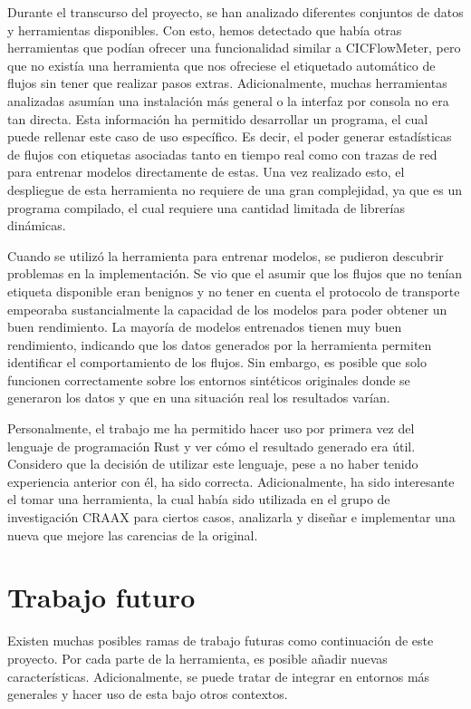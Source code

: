 Durante el transcurso del proyecto, se han analizado diferentes conjuntos de datos y herramientas disponibles. Con esto, hemos detectado que había otras herramientas que podían ofrecer una funcionalidad similar a CICFlowMeter, pero que no existía una herramienta que nos ofreciese el etiquetado automático de flujos sin tener que realizar pasos extras. Adicionalmente, muchas herramientas analizadas asumían una instalación más general o la interfaz por consola no era tan directa. Esta información ha permitido desarrollar un programa, el cual puede rellenar este caso de uso específico. Es decir, el poder generar estadísticas de flujos con etiquetas asociadas tanto en tiempo real como con trazas de red para entrenar modelos directamente de estas. Una vez realizado esto, el despliegue de esta herramienta no requiere de una gran complejidad, ya que es un programa compilado, el cual requiere una cantidad limitada de librerías dinámicas.

Cuando se utilizó la herramienta para entrenar modelos, se pudieron descubrir problemas en la implementación. Se vio que el asumir que los flujos que no tenían etiqueta disponible eran benignos y no tener en cuenta el protocolo de transporte empeoraba sustancialmente la capacidad de los modelos para poder obtener un buen rendimiento. La mayoría de modelos entrenados tienen muy buen rendimiento, indicando que los datos generados por la herramienta permiten identificar el comportamiento de los flujos. Sin embargo, es posible que solo funcionen correctamente sobre los entornos sintéticos originales donde se generaron los datos y que en una situación real los resultados varían.

Personalmente, el trabajo me ha permitido hacer uso por primera vez del lenguaje de programación Rust y ver cómo el resultado generado era útil. Considero que la decisión de utilizar este lenguaje, pese a no haber tenido experiencia anterior con él, ha sido correcta. Adicionalmente, ha sido interesante el tomar una herramienta, la cual había sido utilizada en el grupo de investigación CRAAX para ciertos casos, analizarla y diseñar e implementar una nueva que mejore las carencias de la original.

\section{Trabajo futuro}

Existen muchas posibles ramas de trabajo futuras como continuación de este proyecto. Por cada parte de la herramienta, es posible añadir nuevas características. Adicionalmente, se puede tratar de integrar en entornos más generales y hacer uso de esta bajo otros contextos.

